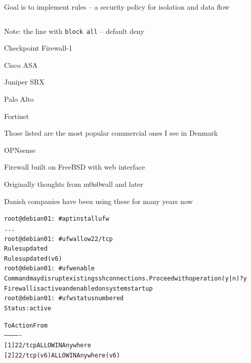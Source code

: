 \documentclass[Screen16to9,17pt]{foils}
\begin{document}
Goal is to implement rules -- a security policy for isolation and data flow



\begin{figure}[H]\tiny
\inputminted{shell}{policies/gateway-config-simple.conf}
\end{figure}

Note: the line with \verb+block all+ -- default deny

\begin{list2}
\item Checkpoint Firewall-1 
\item Cisco ASA 
\item Juniper SRX 
\item Palo Alto 
\item Fortinet 
\end{list2}

Those listed are the most popular commercial ones I see in Denmark




\begin{list1}
\item OPNsense 
\item Firewall built on FreeBSD with web interface
\item Originally thoughts from m0n0wall and later \\
\item Danish companies have been using these for many years now
\end{list1}



\begin{alltt}\footnotesize
root@debian01:~# apt install ufw
...
root@debian01:~# ufw allow 22/tcp
Rules updated
Rules updated (v6)
root@debian01:~# ufw enable
Command may disrupt existing ssh connections. Proceed with operation (y|n)? y
Firewall is active and enabled on system startup
root@debian01:~# ufw status numbered
Status: active

     To                         Action      From
     --                         ------      ----
[ 1] 22/tcp                     ALLOW IN    Anywhere
[ 2] 22/tcp (v6)                ALLOW IN    Anywhere (v6)
\end{alltt}
\end{document}
